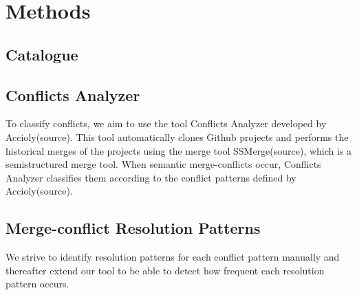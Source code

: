 \chapter{Methods}
\section{Catalogue}
\section{Conflicts Analyzer}
To classify conflicts, we aim to use the tool Conflicts Analyzer developed by Accioly(source). This tool automatically clones Github projects and performs the historical merges of the projects using the merge tool SSMerge(source), which is a semistructured merge tool. When semantic merge-conflicts occur, Conflicts Analyzer classifies them according to the conflict patterns defined by Accioly(source).
\section{Merge-conflict Resolution Patterns}
We strive to identify resolution patterns for each conflict pattern manually and thereafter extend our tool to be able to detect how frequent each resolution pattern occurs.